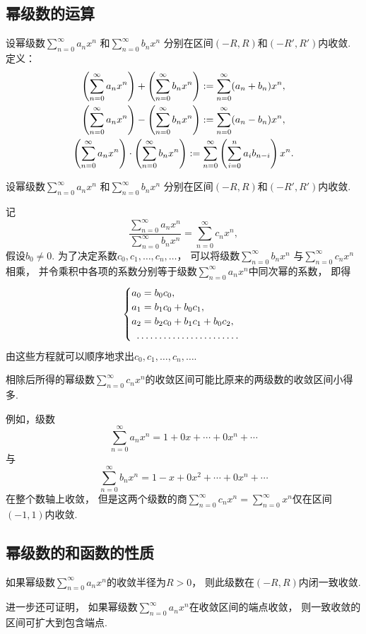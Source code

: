 \subsection{幂级数的运算}
\begin{definition}
设幂级数\(\sum_{n=0}^\infty a_n x^n\)
和\(\sum_{n=0}^\infty b_n x^n\)
分别在区间\((-R,R)\)和\((-R',R')\)内收敛.
定义：
\begin{gather}
	\left(\sum_{n=0}^\infty a_n x^n\right)
	+ \left(\sum_{n=0}^\infty b_n x^n\right)
	:=
	\sum_{n=0}^\infty (a_n+b_n) x^n, \\
	\left(\sum_{n=0}^\infty a_n x^n\right)
	- \left(\sum_{n=0}^\infty b_n x^n\right)
	:=
	\sum_{n=0}^\infty (a_n-b_n) x^n, \\
	\left(\sum_{n=0}^\infty a_n x^n\right)
	\cdot \left(\sum_{n=0}^\infty b_n x^n\right)
	:=
	\sum_{n=0}^\infty \left(
		\sum_{i=0}^n a_i b_{n-i}
	\right) x^n.
\end{gather}
\end{definition}

\begin{definition}
设幂级数\(\sum_{n=0}^\infty a_n x^n\)
和\(\sum_{n=0}^\infty b_n x^n\)
分别在区间\((-R,R)\)和\((-R',R')\)内收敛.

记\[
	\frac{
		\sum_{n=0}^\infty a_n x^n
	}{
		\sum_{n=0}^\infty b_n x^n
	}
	= \sum_{n=0}^\infty c_n x^n,
\]
假设\(b_0 \neq 0\).
为了决定系数\(c_0,c_1,\dotsc,c_n,\dotsc\)，
可以将级数\(\sum_{n=0}^\infty b_n x^n\)
与\(\sum_{n=0}^\infty c_n x^n\)相乘，
并令乘积中各项的系数分别等于级数\(\sum_{n=0}^\infty a_n x^n\)中同次幂的系数，
即得\[
	\begin{cases}
		a_0 = b_0 c_0, \\
		a_1 = b_1 c_0 + b_0 c_1, \\
		a_2 = b_2 c_0 + b_1 c_1 + b_0 c_2, \\
		\hdotsfor{1} \\
	\end{cases}
\]
由这些方程就可以顺序地求出\(c_0,c_1,\dotsc,c_n,\dotsc\).

相除后所得的幂级数\(\sum_{n=0}^\infty c_n x^n\)的收敛区间可能比原来的两级数的收敛区间小得多.
\end{definition}

例如，级数\[
	\sum_{n=0}^\infty a_n x^n
	= 1 + 0x + \dotsb + 0x^n + \dotsb
\]与\[
	\sum_{n=0}^\infty b_n x^n
	= 1 - x + 0x^2 + \dotsb + 0x^n + \dotsb
\]在整个数轴上收敛，
但是这两个级数的商\(\sum_{n=0}^\infty c_n x^n
= \sum_{n=0}^\infty x^n\)仅在区间\((-1,1)\)内收敛.

\subsection{幂级数的和函数的性质}
\begin{property}\label{theorem:无穷级数.一致收敛的幂级数的性质}
如果幂级数\(\sum_{n=0}^\infty a_n x^n\)的收敛半径为\(R>0\)，
则此级数在\((-R,R)\)内闭一致收敛.
\end{property}
进一步还可证明，
如果幂级数\(\sum_{n=0}^\infty a_n x^n\)在收敛区间的端点收敛，
则一致收敛的区间可扩大到包含端点.

